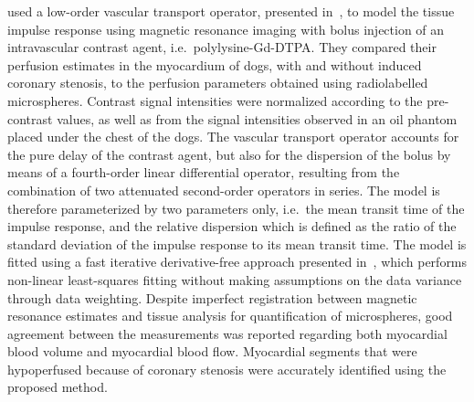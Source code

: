 \citet{Wilke:1995dt} used a low-order vascular transport operator, presented in~\cite{King:1993uj}, to model the tissue impulse response using magnetic resonance imaging with bolus injection of an intravascular contrast agent, i.e.~polylysine-Gd-DTPA. 
They compared their perfusion estimates in the myocardium of dogs, with and without induced coronary stenosis, to the perfusion parameters obtained using radiolabelled microspheres.
Contrast signal intensities were normalized according to the pre-contrast values, as well as from the signal intensities observed in an oil phantom placed under the chest of the dogs.
The vascular transport operator accounts for the pure delay of the contrast agent, but also for the dispersion of the bolus by means of a fourth-order linear differential operator, resulting from the combination of two attenuated second-order operators in series.
The model is therefore parameterized by two parameters only, i.e.~the mean transit time of the impulse response, and the relative dispersion which is defined as the ratio of the standard deviation of the impulse response to its mean transit time.
The model is fitted using a fast iterative derivative-free approach presented in~\cite{Chan:1993ve}, which performs non-linear least-squares fitting without making assumptions on the data variance through data weighting.
Despite imperfect registration between magnetic resonance estimates and tissue analysis for quantification of microspheres, good agreement between the measurements was reported regarding both myocardial blood volume and myocardial blood flow.
Myocardial segments that were hypoperfused because of coronary stenosis were accurately identified using the proposed method.

